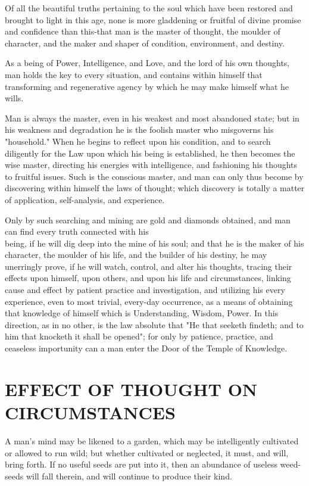 \documentclass[10pt]{article}
\begin{document}
Of all the beautiful truths pertaining to the soul which have been restored and brought to light in this age, none is more gladdening or fruitful of divine promise and confidence than this-that man is the master of thought, the moulder of character, and the maker and shaper of condition, environment, and destiny.

As a being of Power, Intelligence, and Love, and the lord of his own thoughts, man holds the key to every situation, and contains within himself that transforming and regenerative agency by which he may make himself what he wills.

Man is always the master, even in his weakest and most abandoned state; but in his weakness and degradation he is the foolish master who misgoverns his "household." When he begins to reflect upon his condition, and to search diligently for the Law upon which his being is established, he then becomes the wise master, directing his energies with intelligence, and fashioning his thoughts to fruitful issues. Such is the conscious master, and man can only thus become by discovering within himself the laws of thought; which discovery is totally a matter of application, self-analysis, and experience.

Only by such searching and mining are gold and diamonds obtained, and man can find every truth connected with his\\
being, if he will dig deep into the mine of his soul; and that he is the maker of his character, the moulder of his life, and the builder of his destiny, he may unerringly prove, if he will watch, control, and alter his thoughts, tracing their effects upon himself, upon others, and upon his life and circumstances, linking cause and effect by patient practice and investigation, and utilizing his every experience, even to most trivial, every-day occurrence, as a means of obtaining that knowledge of himself which is Understanding, Wisdom, Power. In this direction, as in no other, is the law absolute that "He that seeketh findeth; and to him that knocketh it shall be opened"; for only by patience, practice, and ceaseless importunity can a man enter the Door of the Temple of Knowledge.

\section*{EFFECT OF THOUGHT ON CIRCUMSTANCES}
A man's mind may be likened to a garden, which may be intelligently cultivated or allowed to run wild; but whether cultivated or neglected, it must, and will, bring forth. If no useful seeds are put into it, then an abundance of useless weed-seeds will fall therein, and will continue to produce their kind.
\end{document}

